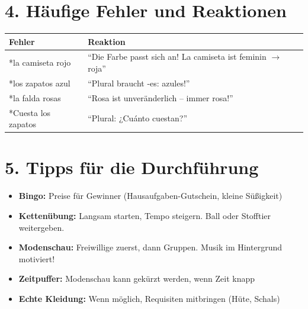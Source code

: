 \documentclass[11pt, a4paper]{article}
\begin{document}

\section*{4. Häufige Fehler und Reaktionen}

\begin{warnbox}
\begin{tabular}{|p{5cm}|p{8cm}|}
\hline
\textbf{Fehler} & \textbf{Reaktion} \\
\hline
*la camiseta rojo & ``Die Farbe passt sich an! La camiseta ist feminin $\rightarrow$ roja'' \\
\hline
*los zapatos azul & ``Plural braucht -es: azules!'' \\
\hline
*la falda rosas & ``Rosa ist unveränderlich -- immer rosa!'' \\
\hline
*Cuesta los zapatos & ``Plural: ¿Cuánto cuestan?'' \\
\hline
\end{tabular}
\end{warnbox}


\section*{5. Tipps für die Durchführung}

\begin{tippbox}[Praxistipps]
\begin{itemize}[nosep, leftmargin=*]
    \item \textbf{Bingo:} Preise für Gewinner (Hausaufgaben-Gutschein, kleine Süßigkeit)
    \item \textbf{Kettenübung:} Langsam starten, Tempo steigern. Ball oder Stofftier weitergeben.
    \item \textbf{Modenschau:} Freiwillige zuerst, dann Gruppen. Musik im Hintergrund motiviert!
    \item \textbf{Zeitpuffer:} Modenschau kann gekürzt werden, wenn Zeit knapp
    \item \textbf{Echte Kleidung:} Wenn möglich, Requisiten mitbringen (Hüte, Schals)
\end{itemize}
\end{tippbox}
\end{document}
